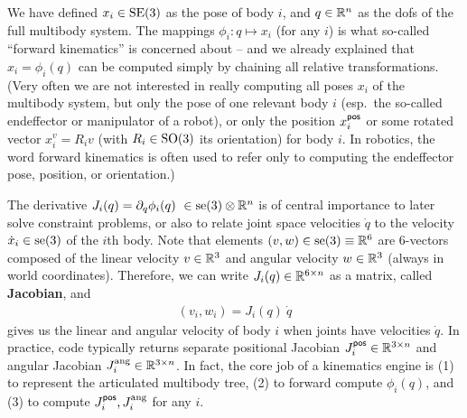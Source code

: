 We have defined $x_i\in\text{SE}(3)$ as the pose of body $i$, and
$q\in{\mathbb{R}}^n$ as the dofs of the full multibody system. The mappings $\phi_i: q
\mapsto x_i$ (for any $i$) is what so-called ``forward kinematics'' is
concerned about -- and we already explained that $x_i = \phi_i(q)$ can
be computed simply by chaining all relative transformations. (Very
often we are not interested in really computing all poses $x_i$ of the
multibody system, but only the pose of one relevant body $i$ (esp.\
the so-called endeffector or manipulator of a robot), or only the position
$x^{\textsf{pos}}_i$ or some rotated vector $x^v_i = R_i v$ (with
$R_i \in \text{SO}(3)$ its orientation) for body $i$. In robotics, the word
forward kinematics is often used to refer only to computing the
endeffector pose, position, or orientation.)

The derivative $J_i(q)=\partial_q \phi_i(q) ~ \in \text{se}(3) \otimes {\mathbb{R}}^n$ is
of central importance to later solve constraint problems, or also to
relate joint space velocities $\dot q$ to the velocity $\dot x_i \in
\text{se}(3)$ of the $i$th body. Note that elements $(v,w)\in \text{se}(3) \equiv
{\mathbb{R}}^6$ are 6-vectors composed of the linear velocity $v\in{\mathbb{R}}^3$ and
angular velocity $w\in{\mathbb{R}}^3$ (always in world
coordinates). Therefore, we can write $J_i(q) \in {\mathbb{R}}^{6 \times n}$
as a matrix, called \textbf{Jacobian}, and
\begin{align}
(v_i,w_i) = J_i(q)~ \dot q
\end{align}
gives us the linear and angular velocity of body $i$ when joints have
velocities $\dot q$. In practice, code typically returns separate positional Jacobian $J_i^{\textsf{pos}} \in {\mathbb{R}}^{3\times n}$ and angular
Jacobian $J_i^{\text{ang}} \in {\mathbb{R}}^{3\times n}$. In fact, the core job of a
kinematics engine is (1) to represent the articulated multibody tree,
(2) to forward compute $\phi_i(q)$, and (3) to compute
$J_i^{\textsf{pos}}, J_i^{\text{ang}}$ for any $i$.

